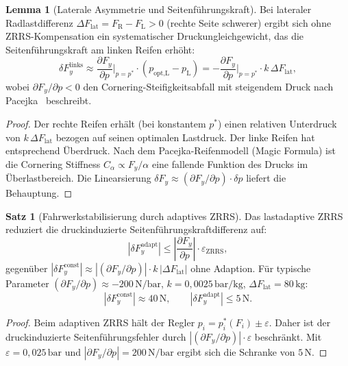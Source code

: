 ﻿\documentclass[a4paper,12pt]{article}
\theoremstyle{definition}
\newtheorem{satz}{Satz}
\newtheorem{lemma}{Lemma}
\begin{document}
\begin{lemma}[Laterale Asymmetrie und Seitenführungskraft]
\label{lem:lateral}
Bei lateraler Radlastdifferenz $\Delta F_{\text{lat}} = F_{\text{R}} - F_{\text{L}} > 0$
(rechte Seite schwerer) ergibt sich ohne ZRRS-Kompensation ein systematischer
Druckungleichgewicht, das die Seitenführungskraft am linken Reifen erhöht:
\[
    \delta F_y^{\text{links}} \approx
    \frac{\partial F_y}{\partial p}\bigg|_{p=p^*} \cdot (p_{\text{opt,L}} - p_{\text{L}})
    = -\frac{\partial F_y}{\partial p}\bigg|_{p=p^*} \cdot k\,\Delta F_{\text{lat}},
\]
wobei $\partial F_y / \partial p < 0$ den Cornering-Steifigkeitsabfall mit
steigendem Druck nach Pacejka~\cite{pacejka} beschreibt.
\end{lemma}

\begin{proof}
Der rechte Reifen erhält (bei konstantem $p^*$) einen relativen Unterdruck
von $k\,\Delta F_{\text{lat}}$ bezogen auf seinen optimalen Lastdruck. Der
linke Reifen hat entsprechend Überdruck. Nach dem Pacejka-Reifenmodell
(Magic Formula) ist die Cornering Stiffness $C_\alpha \propto F_y / \alpha$
eine fallende Funktion des Drucks im Überlastbereich. Die Linearsierung
$\delta F_y \approx (\partial F_y / \partial p) \cdot \delta p$ liefert die
Behauptung.
\end{proof}

\begin{satz}[Fahrwerkstabilisierung durch adaptives ZRRS]
\label{satz:stabfahrwerk}
Das lastadaptive ZRRS reduziert die druckinduzierte Seitenführungskraftdifferenz
auf:
\[
    |\delta F_y^{\text{adapt}}| \leq \left|\frac{\partial F_y}{\partial p}\right|
    \cdot \varepsilon_{\text{ZRRS}},
\]
gegenüber $|\delta F_y^{\text{const}}| \approx |(\partial F_y / \partial p)| \cdot k\,|\Delta F_{\text{lat}}|$
ohne Adaption. Für typische Parameter
$(\partial F_y / \partial p) \approx -200\,\text{N/bar}$,
$k = 0{,}0025\,\text{bar/kg}$, $\Delta F_{\text{lat}} = 80\,\text{kg}$:
\[
    |\delta F_y^{\text{const}}| \approx 40\,\text{N},
    \qquad
    |\delta F_y^{\text{adapt}}| \leq 5\,\text{N}.
\]
\end{satz}

\begin{proof}
Beim adaptiven ZRRS hält der Regler $p_i = p^*_i(F_i) \pm \varepsilon$.
Daher ist der druckinduzierte Seitenführungsfehler durch
$|(\partial F_y / \partial p)| \cdot \varepsilon$ beschränkt. Mit
$\varepsilon = 0{,}025\,\text{bar}$ und $|\partial F_y / \partial p| = 200\,\text{N/bar}$
ergibt sich die Schranke von $5\,\text{N}$.
\end{proof}
\end{document}
